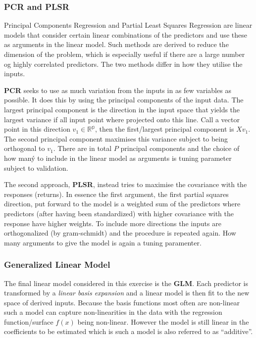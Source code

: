 \documentclass[]{article}
\begin{document}
\hypertarget{pcr-and-plsr}{%
\subsubsection{PCR and PLSR}\label{pcr-and-plsr}}

Principal Components Regression and Partial Least Squares Regression are
linear models that consider certain linear combinations of the
predictors and use these as arguments in the linear model. Such methods
are derived to reduce the dimension of the problem, which is especially
useful if there are a large number og highly correlated predictors. The
two methods differ in how they utilise the inputs.

\textbf{PCR} seeks to use as much variation from the inputs in as few
variables as possible. It does this by using the principal components of
the input data. The largest principal component is the direction in the
input space that yields the largest variance if all input point where
projected onto this line. Call a vector point in this direction
\(v_1 \in \mathbb{R^p}\), then the first/largest principal component is
\(X v_1\). The second principal component maximises this variance
subject to being orthogonal to \(v_1\). There are in total \(P\)
principal components and the choice of how maný to include in the linear
model as arguments is tuning parameter subject to validation.

The second approach, \textbf{PLSR}, instead tries to maximise the
covariance with the responses (returns). In essence the first argument,
the first partial squares direction, put forward to the model is a
weighted sum of the predictors where predictors (after having been
standardized) with higher covariance with the response have higher
weights. To include more directions the inputs are orthogonalized (by
gram-schmidt) and the procedure is repeated again. How many arguments to
give the model is again a tuning paramenter.

\hypertarget{generalized-linear-model}{%
\subsubsection{Generalized Linear
Model}\label{generalized-linear-model}}

The final linear model considered in this exercise is the \textbf{GLM}.
Each predictor is transformed by a \emph{linear basis expansion} and a
linear model is then fit to the new space of derived inputs. Because the
basis functions most often are non-linear such a model can capture
non-linearities in the data with the regression function/surface
\(f(x)\) being non-linear. However the model is still linear in the
coefficients to be estimated which is such a model is also referred to
as ``additive''.
\end{document}
